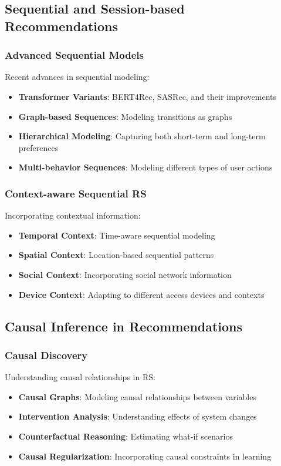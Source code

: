 \subsection{Sequential and Session-based Recommendations}

\subsubsection{Advanced Sequential Models}

Recent advances in sequential modeling:
\begin{itemize}
    \item \textbf{Transformer Variants}: BERT4Rec, SASRec, and their improvements
    \item \textbf{Graph-based Sequences}: Modeling transitions as graphs
    \item \textbf{Hierarchical Modeling}: Capturing both short-term and long-term preferences
    \item \textbf{Multi-behavior Sequences}: Modeling different types of user actions
\end{itemize}

\subsubsection{Context-aware Sequential RS}

Incorporating contextual information:
\begin{itemize}
    \item \textbf{Temporal Context}: Time-aware sequential modeling
    \item \textbf{Spatial Context}: Location-based sequential patterns
    \item \textbf{Social Context}: Incorporating social network information
    \item \textbf{Device Context}: Adapting to different access devices and contexts
\end{itemize}

\subsection{Causal Inference in Recommendations}

\subsubsection{Causal Discovery}

Understanding causal relationships in RS:
\begin{itemize}
    \item \textbf{Causal Graphs}: Modeling causal relationships between variables
    \item \textbf{Intervention Analysis}: Understanding effects of system changes
    \item \textbf{Counterfactual Reasoning}: Estimating what-if scenarios
    \item \textbf{Causal Regularization}: Incorporating causal constraints in learning
\end{itemize}

